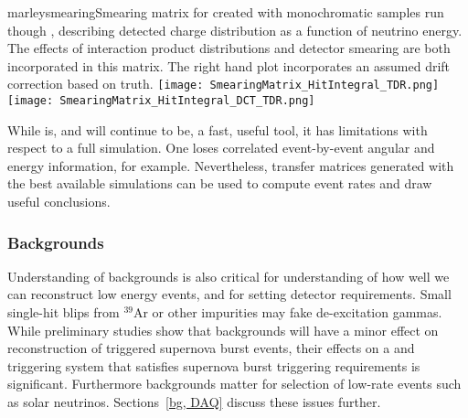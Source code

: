 

\begin{dunefigure}{marleysmearing}{Smearing matrix for
      created with monochromatic  samples run though
    , describing detected charge distribution as a function of
    neutrino energy.  The effects of interaction product distributions
  and detector smearing are both incorporated in this matrix.  The
  right hand plot 
  incorporates an assumed drift correction based on  truth.}
\texttt{[image: SmearingMatrix\_HitIntegral\_TDR.png]}
\texttt{[image: SmearingMatrix\_HitIntegral\_DCT\_TDR.png]}
\end{dunefigure}


While  is, and will continue to be, a fast, useful tool,
it has limitations with respect to a full simulation.  One loses correlated
event-by-event angular and energy information, for example.
Nevertheless, transfer matrices generated with the best available
simulations can be used to compute event rates and draw useful conclusions.


\subsubsection{Backgrounds}

Understanding of backgrounds is also critical for understanding of how
well we can reconstruct low energy events, and for setting detector
requirements.  Small single-hit blips from $^{39}$Ar or other
impurities may fake de-excitation gammas.  While preliminary studies
show that backgrounds will have a minor effect on reconstruction of
triggered supernova burst events, their effects on a  and
triggering system that satisfies supernova burst triggering
requirements is significant.  Furthermore backgrounds matter for
selection of low-rate events such as solar neutrinos.
Sections~\ref{bg, DAQ} discuss these issues further.


